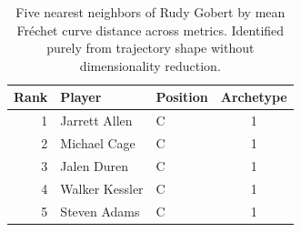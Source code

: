 \begin{table}[htbp]
  \centering\small
  \begin{tabular}{rllc}
    \toprule
    Rank & Player & Position & Archetype \\
    \midrule
    1 & Jarrett Allen & C & 1 \\
    2 & Michael Cage & C & 1 \\
    3 & Jalen Duren & C & 1 \\
    4 & Walker Kessler & C & 1 \\
    5 & Steven Adams & C & 1 \\
    \bottomrule
  \end{tabular}
  \caption{Five nearest neighbors of Rudy Gobert by mean Fr\'{e}chet curve distance across metrics. Identified purely from trajectory shape without dimensionality reduction.}
  \label{tab:Rudy_Gobert_frechet_curve_neighbors}
\end{table}

